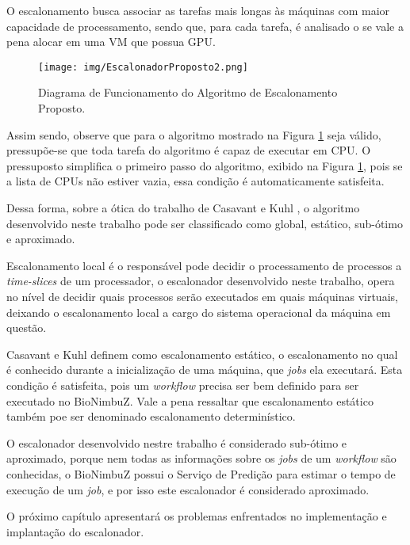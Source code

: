 O escalonamento busca associar as tarefas mais longas às máquinas com maior capacidade de processamento, sendo que, para cada tarefa, é analisado o se vale a pena alocar em uma \acrshort{VM} que possua \acrshort{GPU}.


\begin{figure}[htbp]
	\centerline{\texttt{[image: img/EscalonadorProposto2.png]}}
	\caption{Diagrama de Funcionamento do Algoritmo de Escalonamento Proposto.}
	\label{Escalonamento}
\end{figure}


Assim sendo, observe que para o algoritmo mostrado na Figura \ref{Escalonamento} seja válido, pressupõe-se que toda tarefa do algoritmo é capaz de executar em \acrshort{CPU}. O pressuposto simplifica o primeiro passo do algoritmo, exibido na Figura \ref{Escalonamento}, pois se a lista de \acrshort{CPU}s não estiver vazia, essa condição é automaticamente satisfeita.

Dessa forma, sobre a ótica do trabalho de Casavant e Kuhl \cite{4634_TaxonomiaEscalonador}, o algoritmo desenvolvido neste trabalho pode ser classificado como global, estático, sub-ótimo e aproximado.%

Escalonamento local é o responsável pode decidir o processamento de processos a \textit{time-slices} de um processador, o escalonador desenvolvido neste trabalho, opera no nível de decidir quais processos serão executados em quais máquinas virtuais, deixando o escalonamento local a cargo do sistema operacional da máquina em questão.

Casavant e Kuhl \cite{4634_TaxonomiaEscalonador} definem como escalonamento estático, o escalonamento no qual é conhecido durante a inicialização de uma máquina, que \textit{jobs} ela executará. Esta condição é satisfeita, pois um \textit{workflow} precisa ser bem definido para ser executado no BioNimbuZ. Vale a pena ressaltar que escalonamento estático também poe ser denominado escalonamento determinístico.

O escalonador desenvolvido nestre trabalho é considerado sub-ótimo e aproximado, porque nem todas as informações sobre os \textit{jobs} de um \textit{workflow} são conhecidas, o BioNimbuZ possui o Serviço de Predição para estimar o tempo de execução de um \textit{job}, e por isso este escalonador é considerado aproximado.


O próximo capítulo apresentará os problemas enfrentados no implementação e implantação do escalonador.




